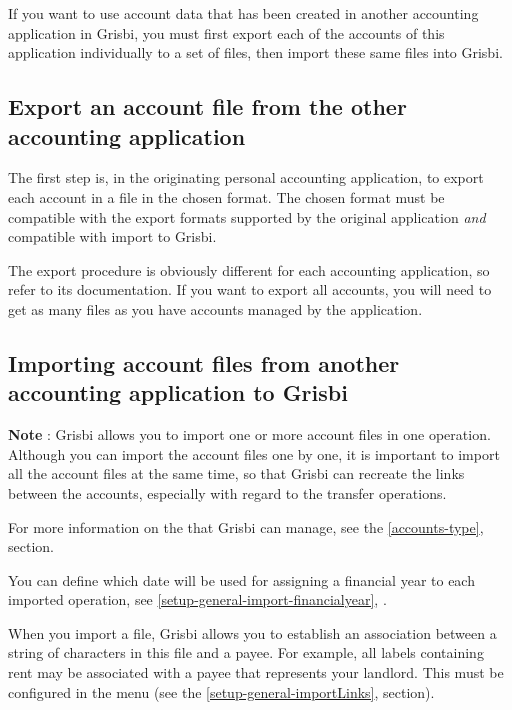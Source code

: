 If you want to use account data that has been created
in another accounting application in Grisbi, you must first export each of the accounts of this application individually to a set of files, then import these same files into Grisbi.

\subsection{Export an account file from the other accounting application \label{move-import-exportinit}}

The first step is, in the originating personal accounting application, to export each account in a file in the chosen format. The chosen format must be compatible with the export formats supported by the original application \emph{and} compatible with import to Grisbi.

The export procedure is obviously different for each accounting application, so refer to its documentation. If you want to export all accounts, you will need to get as many files as you have accounts managed by the application.


\subsection{Importing account files from another accounting application to Grisbi\label{move-import-importinit}}

\textbf{Note} : Grisbi allows you to import one or more account files in one operation. Although you can import the account files one by one, it is important to import all the account files at the same time, so that Grisbi can recreate the links between the accounts, especially with regard to the transfer operations.

For more information on the  that Grisbi can manage, see the \vref{accounts-type},  section.

You can define which date will be used for assigning a financial year to
each imported operation, see \vref{setup-general-import-financialyear}, .

When you import a file, Grisbi allows you to establish an association between a string of characters in this file and a payee. For example, all labels containing \og rent \fg{}  may be associated with a payee that represents your landlord. This must be configured in the  menu (see the \vref{setup-general-importLinks},  section).


